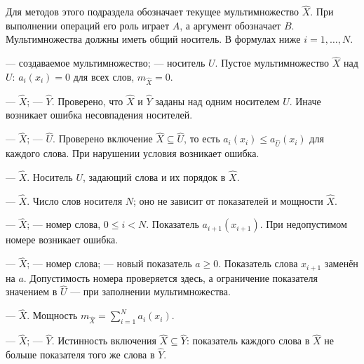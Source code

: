 Для методов этого подраздела  обозначает текущее мультимножество $\hat X$. При выполнении операций его роль играет $A$, а аргумент  обозначает $B$. Мультимножества должны иметь общий носитель. В формулах ниже $i=1,\ldots,N$.

{ — создаваемое мультимножество;  — носитель $U$.}
{Пустое мультимножество $\hat X$ над $U$: $a_i(x_i)=0$ для всех слов, $m_{\hat X}=0$.}

{ — $\hat X$;  — $\hat Y$.}
{Проверено, что $\hat X$ и $\hat Y$ заданы над одним носителем $U$. Иначе возникает ошибка несовпадения носителей.}

{ — $\hat X$;  — $\hat U$.}
{Проверено включение $\hat X\subseteq\hat U$, то есть $a_i(x_i)\le a_{\hat U}(x_i)$ для каждого слова. При нарушении условия возникает ошибка.}

{ — $\hat X$.}
{Носитель $U$, задающий слова и их порядок в $\hat X$.}

{ — $\hat X$.}
{Число слов носителя $N$; оно не зависит от показателей и мощности $\hat X$.}

{ — $\hat X$;  — номер слова, $0\le i<N$.}
{Показатель $a_{i+1}(x_{i+1})$. При недопустимом номере возникает ошибка.}

{ — $\hat X$;  — номер слова;  — новый показатель $a\ge0$.}
{Показатель слова $x_{i+1}$ заменён на $a$. Допустимость номера проверяется здесь, а ограничение показателя значением в $\hat U$ — при заполнении мультимножества.}

{ — $\hat X$.}
{Мощность $m_{\hat X}=\sum_{i=1}^{N}a_i(x_i)$.}

{ — $\hat X$;  — $\hat Y$.}
{Истинность включения $\hat X\subseteq\hat Y$: показатель каждого слова в $\hat X$ не больше показателя того же слова в $\hat Y$.}

